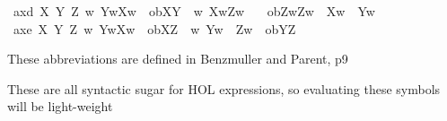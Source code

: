 \begin{isabellebody}
\isanewline
{}\ ax{\isacharunderscore}{}d{\isacharcolon}\ {\isachardoublequoteopen}{\isasymforall}X\ Y\ Z{\isachardot}\ {\isacharparenleft}{\isacharparenleft}{\isasymforall}w{\isachardot}\ Y{\isacharparenleft}w{\isacharparenright}{\isasymlongrightarrow}X{\isacharparenleft}w{\isacharparenright}{\isacharparenright}\ {\isasymand}\ ob{\isacharparenleft}X{\isacharparenright}{\isacharparenleft}Y{\isacharparenright}\ {\isasymand}\ {\isacharparenleft}{\isasymforall}w{\isachardot}\ X{\isacharparenleft}w{\isacharparenright}{\isasymlongrightarrow}Z{\isacharparenleft}w{\isacharparenright}{\isacharparenright}{\isacharparenright}\ \isanewline
\ \ {\isasymlongrightarrow}ob{\isacharparenleft}Z{\isacharparenright}{\isacharparenleft}{\isasymlambda}w{\isachardot}{\isacharparenleft}Z{\isacharparenleft}w{\isacharparenright}\ {\isasymand}\ {\isasymnot}X{\isacharparenleft}w{\isacharparenright}{\isacharparenright}\ {\isasymor}\ Y{\isacharparenleft}w{\isacharparenright}{\isacharparenright}{\isachardoublequoteclose}\isanewline
%
\isanewline
\isanewline
{}\ ax{\isacharunderscore}{}e{\isacharcolon}\ {\isachardoublequoteopen}{\isasymforall}X\ Y\ Z{\isachardot}\ {\isacharparenleft}{\isacharparenleft}{\isasymforall}w{\isachardot}\ Y{\isacharparenleft}w{\isacharparenright}{\isasymlongrightarrow}X{\isacharparenleft}w{\isacharparenright}{\isacharparenright}\ {\isasymand}\ ob{\isacharparenleft}X{\isacharparenright}{\isacharparenleft}Z{\isacharparenright}\ {\isasymand}\ {\isacharparenleft}{\isasymexists}w{\isachardot}\ Y{\isacharparenleft}w{\isacharparenright}\ {\isasymand}\ Z{\isacharparenleft}w{\isacharparenright}{\isacharparenright}{\isacharparenright}\ {\isasymlongrightarrow}\ ob{\isacharparenleft}Y{\isacharparenright}{\isacharparenleft}Z{\isacharparenright}{\isachardoublequoteclose}\isanewline
%
%
\isadelimdocument
%
\endisadelimdocument
%
\isatagdocument
%
\isamarkuptrue%
%
\endisatagdocument
{\isafolddocument}%
%
\isadelimdocument
%
\endisadelimdocument
%
\begin{isamarkuptext}%
These abbreviations are defined in Benzmuller and Parent, p9%
\end{isamarkuptext}\isamarkuptrue%
%
\begin{isamarkuptext}%
These are all syntactic sugar for HOL expressions, so evaluating these symbols will be light-weight%

\end{isamarkuptext}
\end{isabellebody}
